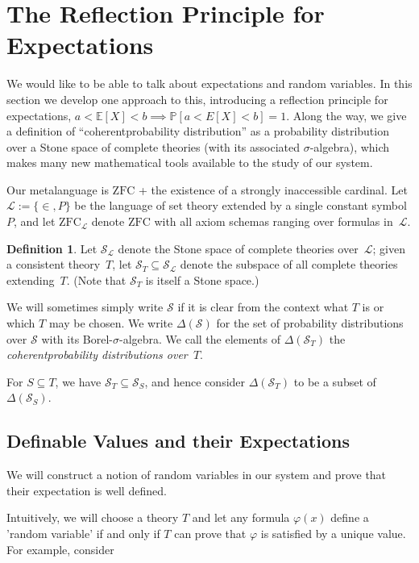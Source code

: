\documentclass[12pt]{article}
\newcommand{\PP}{\mathbb{P}}
\newcommand{\vp}{\varphi}
\newcommand{\EE}{\mathbb{E}}
\newcommand{\zfc}{\mathrm{ZFC}}
\newcommand{\zfcl}{{\zfc_\cL}}
\newcommand{\cSL}{{\cS_\cL}}
\newcommand{\cL}{\mathcal{L}}
\newcommand{\cS}{\mathcal{S}}
\newcommand{\coh}{coherent}
\theoremstyle{plain}
\theoremstyle{definition}
\newtheorem{definition}[theorem]{Definition}
\theoremstyle{remark}
\begin{document}
\section{The Reflection Principle for Expectations}
\label{refl-exp}
We would like to be able to talk about expectations and random variables. In this section we develop one approach to this, introducing a reflection principle for expectations, $a < \EE[X] < b \implies \PP[a < E[X] < b] = 1$.
Along the way, we give a definition of ``\coh probability distribution'' as a probability distribution over a Stone space of complete theories (with its associated $\sigma$-algebra), which makes many new mathematical tools available to the study of our system.

Our metalanguage is $\zfc$ + the existence of a strongly inaccessible cardinal.
Let $\cL := \{\in,P\}$ be the language of set theory extended by a single constant symbol $P$, and let $\zfcl$ denote $\zfc$ with all axiom schemas ranging over formulas in~$\cL$.
\begin{definition}
Let $\cSL$ denote the Stone space of complete theories over~$\cL$; given a consistent theory~$T$, let $\cS_T\subseteq\cSL$ denote the subspace of all complete theories extending~$T$. (Note that $\cS_T$ is itself a Stone space.) 

We will sometimes simply write $\cS$ if it is clear from the context what $T$ is or which $T$ may be chosen.
We write $\Delta(\cS)$ for the set of probability distributions over $\cS$ with its Borel-$\sigma$-algebra. We call the elements of $\Delta(\cS_T)$ the \emph{\coh probability distributions over~$T$}.
\end{definition}
For $S\subseteq T$, we have $\cS_T\subseteq\cS_S$, and hence consider $\Delta(\cS_T)$ to be a subset of $\Delta(\cS_S)$.
\subsection{Definable Values and their Expectations}
We will construct a notion of random variables in our system and prove that their expectation is well defined.

Intuitively, we will choose a theory $T$ and let any formula $\vp(x)$ define a 'random variable' if and only if $T$ can prove that $\vp$ is satisfied by a unique value. For example, consider
\end{document}
